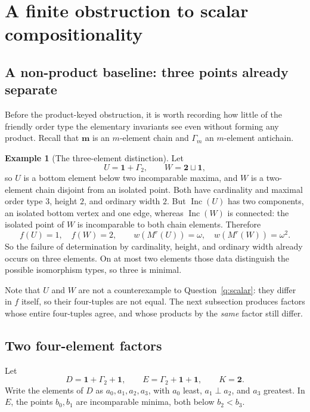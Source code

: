 \documentclass[11pt,letterpaper]{article}
\theoremstyle{definition}
\newtheorem{example}[theorem]{Example}
\theoremstyle{remark}
\newcommand{\Inc}{\operatorname{Inc}}
\newcommand{\one}{\mathbf{1}}
\newcommand{\chain}[1]{\mathbf{#1}}
\newcommand{\anti}[1]{\Gamma_{#1}}
\begin{document}
\section{A finite obstruction to scalar compositionality}\label{sec:counterexample}

\subsection{A non-product baseline: three points already separate}
Before the product-keyed obstruction, it is worth recording how little of
the friendly order type the elementary invariants see even without forming
any product. Recall that $\chain m$ is an $m$-element chain and $\anti m$ an
$m$-element antichain.

\begin{example}[The three-element distinction]\label{ex:three}
Let
\[
 U=\chain1+\anti2,
 \qquad
 W=\chain2\sqcup\chain1,
\]
so $U$ is a bottom element below two incomparable maxima, and $W$ is a
two-element chain disjoint from an isolated point. Both have cardinality and
maximal order type $3$, height $2$, and ordinary width $2$. But $\Inc(U)$
has two components, an isolated bottom vertex and one edge, whereas
$\Inc(W)$ is connected: the isolated point of $W$ is incomparable to both
chain elements. Therefore
\[
 f(U)=1,\quad f(W)=2,
 \qquad
 w(M^r(U))=\omega,\quad w(M^r(W))=\omega^2.
\]
So the failure of determination by cardinality, height, and ordinary width
already occurs on three elements. On at most two elements those data
distinguish the possible isomorphism types, so three is minimal.
\end{example}

Note that $U$ and $W$ are not a counterexample to
Question~\ref{q:scalar}: they differ in $f$ itself, so their four-tuples are
not equal. The next subsection produces factors whose entire four-tuples
agree, and whose products by the \emph{same} factor still differ.

\subsection{Two four-element factors}
Let
\[
 D=\one+\anti2+\one,
 \qquad
 E=\anti2+\one+\one,
 \qquad K=\chain2.
\]
Write the elements of $D$ as $a_0,a_1,a_2,a_3$, with $a_0$ least,
$a_1\perp a_2$, and $a_3$ greatest. In $E$, the points $b_0,b_1$ are
incomparable minima, both below $b_2<b_3$.
\end{document}
